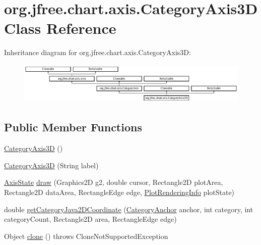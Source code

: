 \hypertarget{classorg_1_1jfree_1_1chart_1_1axis_1_1_category_axis3_d}{}\section{org.\+jfree.\+chart.\+axis.\+Category\+Axis3D Class Reference}
\label{classorg_1_1jfree_1_1chart_1_1axis_1_1_category_axis3_d}
Inheritance diagram for org.\+jfree.\+chart.\+axis.\+Category\+Axis3D\+:\begin{figure}[H]
\begin{center}
\leavevmode
\includegraphics[height=2.000000cm]{classorg_1_1jfree_1_1chart_1_1axis_1_1_category_axis3_d}
\end{center}
\end{figure}
\subsection*{Public Member Functions}
\begin{DoxyCompactItemize}
\item 
\mbox{\hyperlink{classorg_1_1jfree_1_1chart_1_1axis_1_1_category_axis3_d_a718635f04a622860d87318a286769d2f}{Category\+Axis3D}} ()
\item 
\mbox{\hyperlink{classorg_1_1jfree_1_1chart_1_1axis_1_1_category_axis3_d_a7b4d9726160d74f7a2e263f56169bfae}{Category\+Axis3D}} (String label)
\item 
\mbox{\hyperlink{classorg_1_1jfree_1_1chart_1_1axis_1_1_axis_state}{Axis\+State}} \mbox{\hyperlink{classorg_1_1jfree_1_1chart_1_1axis_1_1_category_axis3_d_aeadc465986ab12962ad0542eca769cde}{draw}} (Graphics2D g2, double cursor, Rectangle2D plot\+Area, Rectangle2D data\+Area, Rectangle\+Edge edge, \mbox{\hyperlink{classorg_1_1jfree_1_1chart_1_1plot_1_1_plot_rendering_info}{Plot\+Rendering\+Info}} plot\+State)
\item 
double \mbox{\hyperlink{classorg_1_1jfree_1_1chart_1_1axis_1_1_category_axis3_d_a069ce735a65e0c6ffd3b98bfb3bb328a}{get\+Category\+Java2\+D\+Coordinate}} (\mbox{\hyperlink{classorg_1_1jfree_1_1chart_1_1axis_1_1_category_anchor}{Category\+Anchor}} anchor, int category, int category\+Count, Rectangle2D area, Rectangle\+Edge edge)
\item 
Object \mbox{\hyperlink{classorg_1_1jfree_1_1chart_1_1axis_1_1_category_axis3_d_aee5e4c02d42b934c7476f6e696d078fe}{clone}} ()  throws Clone\+Not\+Supported\+Exception 
\end{DoxyCompactItemize}
